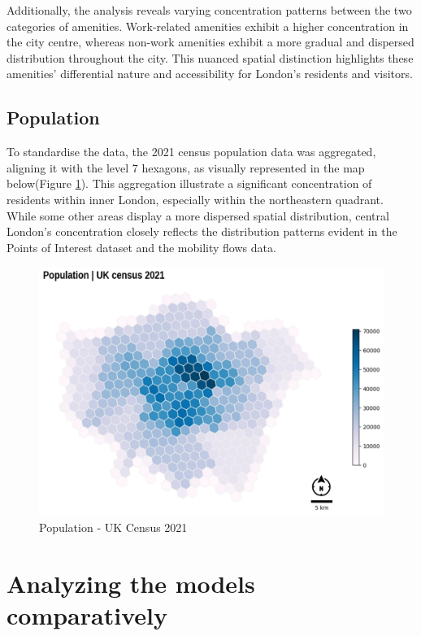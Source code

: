         Additionally, the analysis reveals varying concentration patterns between the two categories of amenities. Work-related amenities exhibit a higher concentration in the city centre, whereas non-work amenities exhibit a more gradual and dispersed distribution throughout the city. This nuanced spatial distinction highlights these amenities' differential nature and accessibility for London's residents and visitors.

        \subsection{Population}
 
        To standardise the data, the 2021 census population data was aggregated, aligning it with the level 7 hexagons, as visually represented in the map below(Figure \ref{fig: Population Census}). This aggregation illustrate a significant concentration of residents within inner London, especially within the northeastern quadrant. While some other areas display a more dispersed spatial distribution, central London's concentration closely reflects the distribution patterns evident in the Points of Interest dataset and the mobility flows data.
        
        \begin{figure}[H]
            \centering
            \includegraphics[width=12cm]{Images/population.png}
            \caption{Population - UK Census 2021}
            \label{fig: Population Census}
        \end{figure}
    
    \section{Analyzing the models comparatively}  

